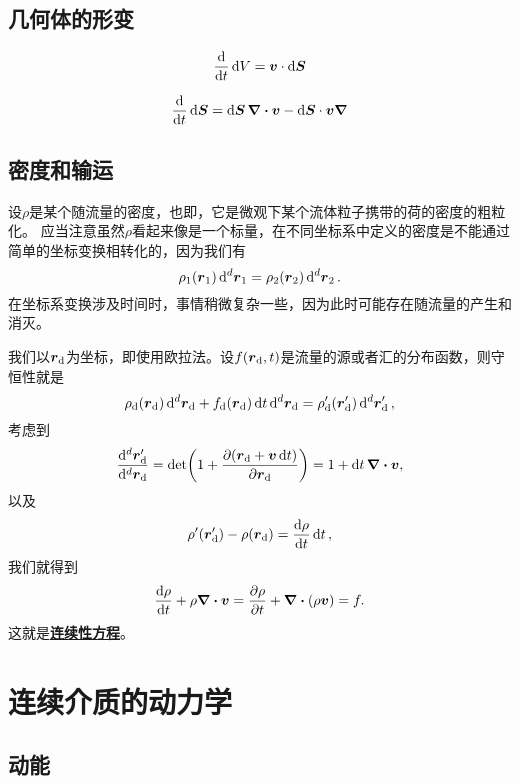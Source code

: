\documentclass[hyperref, UTF8, a4paper]{ctexart}
\newcommand{\concept}[1]{\underline{\textbf{#1}}}
\begin{document}
\subsection{几何体的形变}

\begin{equation}
    \dv{t} \dd{V} = \vb*{v} \cdot \dd{\vb*{S}}
\end{equation}

\begin{equation}
    \dv{t} \dd{\vb*{S}} = \dd{\vb*{S}} \div{\vb*{v}} - \dd{\vb*{S}} \cdot \vb*{v} \grad
\end{equation}

\subsection{密度和输运}

设$\rho$是某个随流量的密度，也即，它是微观下某个流体粒子携带的荷的密度的粗粒化。
应当注意虽然$\rho$看起来像是一个标量，在不同坐标系中定义的密度是不能通过简单的坐标变换相转化的，因为我们有
\[
    \rho_1(\vb*{r}_1) \dd[d]{\vb*{r}_1} = \rho_2(\vb*{r}_2) \dd[d]{\vb*{r}_2}.
\]
在坐标系变换涉及时间时，事情稍微复杂一些，因为此时可能存在随流量的产生和消灭。

我们以$\vb*{r}_\text{d}$为坐标，即使用欧拉法。设$f(\vb*{r}_\text{d}, t)$是流量的源或者汇的分布函数，则守恒性就是
\[
    \rho_\text{d}(\vb*{r}_\text{d}) \dd[d]{\vb*{r}_\text{d}} + f_\text{d} (\vb*{r}_\text{d}) \dd{t} \dd[d]{\vb*{r}_\text{d}} = \rho'_\text{d} (\vb*{r}_\text{d}') \dd[d]{\vb*{r}'_\text{d}},
\]
考虑到
\[
    \frac{\dd[d]{\vb*{r}_\text{d}'}}{\dd[d]{\vb*{r}_\text{d}}} = \det( 1 + \pdv{(\vb*{r}_\text{d} + \vb*{v} \dd{t})}{\vb*{r}_\text{d}} ) = 1 + \dd{t} \div{\vb*{v}},
\]
以及
\[
    \rho'(\vb*{r}_\text{d}') - \rho(\vb*{r}_\text{d}) = \dv{\rho}{t} \dd{t},
\]
我们就得到
\begin{equation}
    \dv{\rho}{t} + \rho \div{\vb*{v}} = \pdv{\rho}{t} + \div{(\rho \vb*{v})} = f.
    \label{eq:transportation-eq}
\end{equation}
这就是\concept{连续性方程}。

\section{连续介质的动力学}

\subsection{动能}
\end{document}
